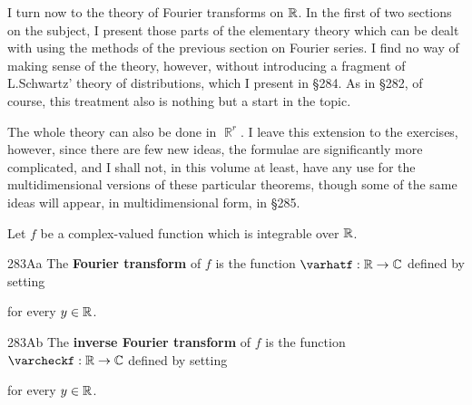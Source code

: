 
\def\chaptername{Fourier analysis}
\def\sectionname{Fourier transforms I}


I turn now to the theory of Fourier transforms on $\Bbb R$.   In the
first of two sections on the subject, I present those parts of the
elementary theory which can be dealt with using the methods of the
previous section on Fourier series.   I find no way of making sense of
the theory, however, without introducing a fragment of L.Schwartz'
theory of distributions, which I present in \S284.
As in \S282, of course, this treatment also is nothing but a start in
the topic.

The whole theory can also be done in $\BbbR^r$.   I leave this
extension to the exercises, however, since there are few new ideas, the
formulae are significantly more complicated, and I shall not, in this
volume at least, have any use for the multidimensional versions of these
particular theorems, though some of the same ideas will appear, in
multidimensional form, in \S285.

 Let $f$ be a complex-valued function which is
integrable over $\Bbb R$.


\spheader 283Aa The {\bf Fourier transform} of $f$ is the
function $\varhatf:\Bbb R\to\Bbb C$ defined by setting


\noindent for every $y\in\Bbb R$.   

\spheader 283Ab The {\bf inverse Fourier transform} of $f$ is
the function $\varcheckf:\Bbb R\to\Bbb C$ defined by setting


\noindent for every $y\in\Bbb R$.

